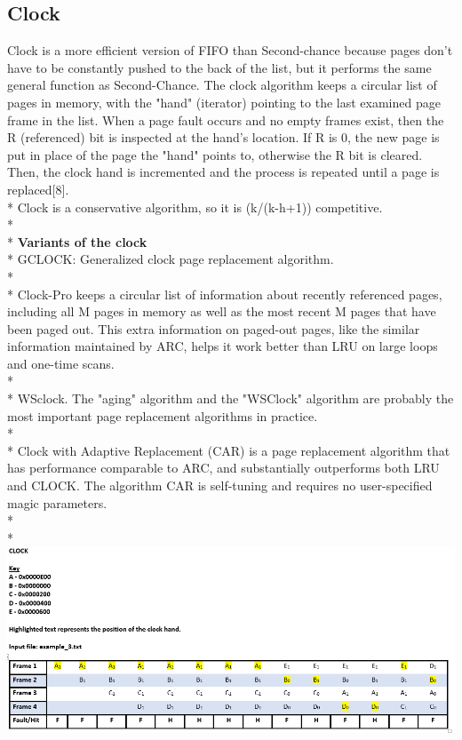 \documentclass[12pt, oneside, a4paper]{report}
\begin{document}
\subsection*{Clock}
Clock is a more efficient version of FIFO than Second-chance because pages don't have to be constantly pushed to the back of the list, but it performs the same general function as Second-Chance. The clock algorithm keeps a circular list of pages in memory, with the "hand" (iterator) pointing to the last examined page frame in the list. When a page fault occurs and no empty frames exist, then the R (referenced) bit is inspected at the hand's location. If R is 0, the new page is put in place of the page the "hand" points to, otherwise the R bit is cleared. Then, the clock hand is incremented and the process is repeated until a page is replaced[8].
\\*
Clock is a conservative algorithm, so it is (k/(k-h+1)) competitive.
\\*
\\*
\textbf{Variants of the clock}
\\*
GCLOCK: Generalized clock page replacement algorithm.
\\*
\\*
Clock-Pro keeps a circular list of information about recently referenced pages, including all M pages in memory as well as the most recent M pages that have been paged out. This extra information on paged-out pages, like the similar information maintained by ARC, helps it work better than LRU on large loops and one-time scans.
\\*
\\*
WSclock. The "aging" algorithm and the "WSClock" algorithm are probably the most important page replacement algorithms in practice.
\\*
\\*
Clock with Adaptive Replacement (CAR) is a page replacement algorithm that has performance comparable to ARC, and substantially outperforms both LRU and CLOCK. The algorithm CAR is self-tuning and requires no user-specified magic parameters.
\\*
\\*
\includegraphics[scale=0.6]{clock}
\newpage
\end{document}
